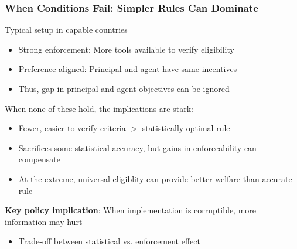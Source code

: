 \documentclass[aspectratio=169]{beamer}
\begin{document}
\begin{frame}
\frametitle{When Conditions Fail: Simpler Rules Can Dominate}
Typical setup in capable countries
\begin{itemize}\setlength\itemsep{3pt}
  \item Strong enforcement: More tools available to verify eligibility
  \item Preference aligned: Principal and agent have same incentives
  \item Thus, gap in principal and agent objectives can be ignored
\end{itemize}\medskip

When none of these hold, the implications are stark:\medskip

\begin{itemize}\setlength\itemsep{6pt}
    \item Fewer, easier-to-verify criteria $>$ statistically optimal rule
    \item Sacrifices some statistical accuracy, but gains in enforceability can compensate
    \item At the extreme, universal eligiblity can provide better welfare than accurate rule
\end{itemize}\medskip

\textbf{Key policy implication}: When implementation is corruptible, more information may hurt
\begin{itemize}\setlength\itemsep{6pt}
    \item Trade-off between statistical vs. enforcement effect
\end{itemize}\medskip


\end{frame}
\end{document}
